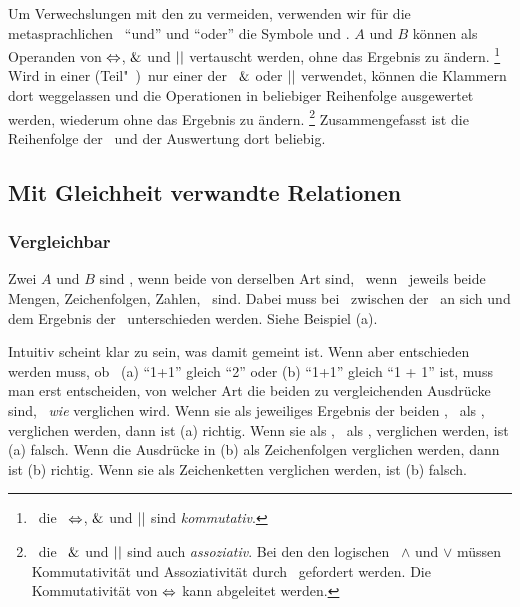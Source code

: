 Um Verwechslungen mit den \Junktoren zu vermeiden, verwenden wir für die metasprachlichen \Operatoren\ \enquote{und} und \enquote{oder} die Symbole \chrqt{$\metaandsym$} und \chrqt{$\metaorsym$}.
$A$ und $B$ können als Operanden von $\Leftrightarrow$, $\metaandsym$ und $\metaorsym$ vertauscht werden, ohne das Ergebnis zu ändern.%
\footnote{%
	\textDh\ die \Operatoren\ $\Leftrightarrow$, $\metaandsym$ und $\metaorsym$ sind \emph{kommutativ}.
}
Wird in einer (Teil"~)\Aussage\ nur einer der \Operatoren\ $\metaandsym$ oder $\metaorsym$ verwendet, können die Klammern dort weggelassen und die Operationen in beliebiger Reihenfolge ausgewertet werden, wiederum ohne das Ergebnis zu ändern.%
\footnote{%
	\textDh\ die \Operatoren\ $\metaandsym$ und $\metaorsym$ sind auch \emph{assoziativ}.
	Bei den den logischen \Operatoren\ $\land$ und $\lor$ müssen Kommutativität und Assoziativität durch \Axiome\ gefordert werden.
	Die Kommutativität von $\Leftrightarrow$ kann abgeleitet werden.
}
Zusammengefasst ist die Reihenfolge der \Operatoren\ und der Auswertung dort beliebig.

\subsection{Mit Gleichheit verwandte Relationen}%
\label{sub:Gleichheit}
\hidden{\Relation}%

\subsubsection{Vergleichbar}%
\label{subsub:Vergleichbar}

Zwei  $A$ und $B$ sind , wenn beide von derselben Art sind, \textdh\ wenn \textzB\ jeweils beide Mengen, Zeichenfolgen, Zahlen, \textusw\ sind.
Dabei muss bei \Formeln\ zwischen der \Formel\ an sich und dem Ergebnis der \Formel\ unterschieden werden. Siehe Beispiel (a).

Intuitiv scheint klar zu sein, was damit  gemeint ist.
Wenn aber entschieden werden muss, ob \textzB\ (a) \enquote{1+1} gleich \enquote{2} oder (b) \enquote{1+1} gleich \enquote{1 + 1} ist, muss man erst entscheiden, von welcher Art die beiden zu vergleichenden Ausdrücke sind, \textdh\ \emph{wie} verglichen wird.
Wenn sie als jeweiliges Ergebnis der beiden \Formeln, \textdh\ als , verglichen werden, dann ist (a) richtig.
Wenn sie als \Formeln, \textdh\ als , verglichen werden, ist (a) falsch.
Wenn die Ausdrücke in (b) als Zeichenfolgen verglichen werden, dann ist (b) richtig.
Wenn sie als Zeichenketten verglichen werden, ist (b) falsch.


